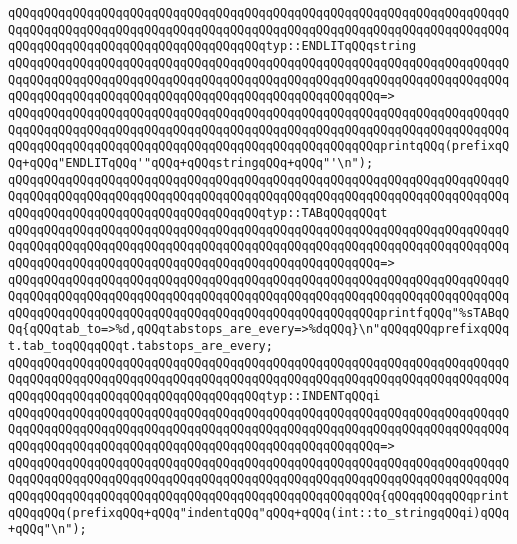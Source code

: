 \newline
\verb|qQQqqQQqqQQqqQQqqQQqqQQqqQQqqQQqqQQqqQQqqQQqqQQqqQQqqQQqqQQqqQQqqQQqqQQqqQQqqQQqqQQqqQQqqQQqqQQqqQQqqQQqqQQqqQQqqQQqqQQqqQQqqQQqqQQqqQQqqQQqqQQqqQQqqQQqqQQqqQQqqQQqqQQqqQQqqQQqtyp::ENDLITqQQqstring|\newline
\verb|qQQqqQQqqQQqqQQqqQQqqQQqqQQqqQQqqQQqqQQqqQQqqQQqqQQqqQQqqQQqqQQqqQQqqQQqqQQqqQQqqQQqqQQqqQQqqQQqqQQqqQQqqQQqqQQqqQQqqQQqqQQqqQQqqQQqqQQqqQQqqQQqqQQqqQQqqQQqqQQqqQQqqQQqqQQqqQQqqQQqqQQqqQQqqQQq=>|\newline
\verb|qQQqqQQqqQQqqQQqqQQqqQQqqQQqqQQqqQQqqQQqqQQqqQQqqQQqqQQqqQQqqQQqqQQqqQQqqQQqqQQqqQQqqQQqqQQqqQQqqQQqqQQqqQQqqQQqqQQqqQQqqQQqqQQqqQQqqQQqqQQqqQQqqQQqqQQqqQQqqQQqqQQqqQQqqQQqqQQqqQQqqQQqqQQqqQQqprintqQQq(prefixqQQq+qQQq"ENDLITqQQq'"qQQq+qQQqstringqQQq+qQQq"'\n");|\newline
\newline
\verb|qQQqqQQqqQQqqQQqqQQqqQQqqQQqqQQqqQQqqQQqqQQqqQQqqQQqqQQqqQQqqQQqqQQqqQQqqQQqqQQqqQQqqQQqqQQqqQQqqQQqqQQqqQQqqQQqqQQqqQQqqQQqqQQqqQQqqQQqqQQqqQQqqQQqqQQqqQQqqQQqqQQqqQQqqQQqqQQqtyp::TABqQQqqQQqt|\newline
\verb|qQQqqQQqqQQqqQQqqQQqqQQqqQQqqQQqqQQqqQQqqQQqqQQqqQQqqQQqqQQqqQQqqQQqqQQqqQQqqQQqqQQqqQQqqQQqqQQqqQQqqQQqqQQqqQQqqQQqqQQqqQQqqQQqqQQqqQQqqQQqqQQqqQQqqQQqqQQqqQQqqQQqqQQqqQQqqQQqqQQqqQQqqQQqqQQq=>|\newline
\verb|qQQqqQQqqQQqqQQqqQQqqQQqqQQqqQQqqQQqqQQqqQQqqQQqqQQqqQQqqQQqqQQqqQQqqQQqqQQqqQQqqQQqqQQqqQQqqQQqqQQqqQQqqQQqqQQqqQQqqQQqqQQqqQQqqQQqqQQqqQQqqQQqqQQqqQQqqQQqqQQqqQQqqQQqqQQqqQQqqQQqqQQqqQQqqQQqprintfqQQq"%sTABqQQq{qQQqtab_to=>%d,qQQqtabstops_are_every=>%dqQQq}\n"qQQqqQQqprefixqQQqt.tab_toqQQqqQQqt.tabstops_are_every;|\newline
\newline
\verb|qQQqqQQqqQQqqQQqqQQqqQQqqQQqqQQqqQQqqQQqqQQqqQQqqQQqqQQqqQQqqQQqqQQqqQQqqQQqqQQqqQQqqQQqqQQqqQQqqQQqqQQqqQQqqQQqqQQqqQQqqQQqqQQqqQQqqQQqqQQqqQQqqQQqqQQqqQQqqQQqqQQqqQQqqQQqqQQqtyp::INDENTqQQqi|\newline
\verb|qQQqqQQqqQQqqQQqqQQqqQQqqQQqqQQqqQQqqQQqqQQqqQQqqQQqqQQqqQQqqQQqqQQqqQQqqQQqqQQqqQQqqQQqqQQqqQQqqQQqqQQqqQQqqQQqqQQqqQQqqQQqqQQqqQQqqQQqqQQqqQQqqQQqqQQqqQQqqQQqqQQqqQQqqQQqqQQqqQQqqQQqqQQqqQQq=>|\newline
\verb|qQQqqQQqqQQqqQQqqQQqqQQqqQQqqQQqqQQqqQQqqQQqqQQqqQQqqQQqqQQqqQQqqQQqqQQqqQQqqQQqqQQqqQQqqQQqqQQqqQQqqQQqqQQqqQQqqQQqqQQqqQQqqQQqqQQqqQQqqQQqqQQqqQQqqQQqqQQqqQQqqQQqqQQqqQQqqQQqqQQqqQQqqQQqqQQq{qQQqqQQqqQQqprintqQQqqQQq(prefixqQQq+qQQq"indentqQQq"qQQq+qQQq(int::to_stringqQQqi)qQQq+qQQq"\n");|\newline
